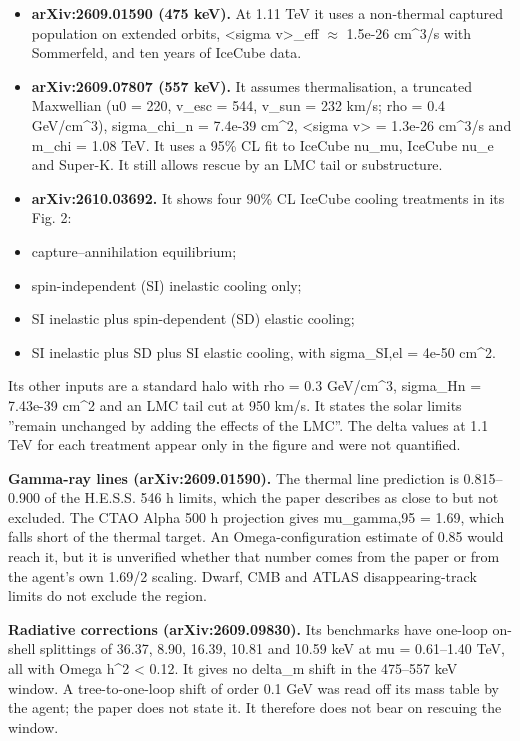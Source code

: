 \documentclass[11pt,a4paper]{article}
\begin{document}
\begin{itemize}
  \item \textbf{arXiv:2609.01590 (475 keV).} At 1.11 TeV it uses a non-thermal captured population on extended orbits, \textless{}sigma v\textgreater{}\_eff $\approx$ 1.5e-26 cm\textasciicircum{}3/s with Sommerfeld, and ten years of IceCube data.
  \item \textbf{arXiv:2609.07807 (557 keV).} It assumes thermalisation, a truncated Maxwellian (u0 = 220, v\_esc = 544, v\_sun = 232 km/s; rho = 0.4 GeV/cm\textasciicircum{}3), sigma\_chi\_n = 7.4e-39 cm\textasciicircum{}2, \textless{}sigma v\textgreater{} = 1.3e-26 cm\textasciicircum{}3/s and m\_chi = 1.08 TeV. It uses a 95\% CL fit to IceCube nu\_mu, IceCube nu\_e and Super-K. It still allows rescue by an LMC tail or substructure.
  \item \textbf{arXiv:2610.03692.} It shows four 90\% CL IceCube cooling treatments in its Fig. 2:
  \item capture--annihilation equilibrium;
  \item spin-independent (SI) inelastic cooling only;
  \item SI inelastic plus spin-dependent (SD) elastic cooling;
  \item SI inelastic plus SD plus SI elastic cooling, with sigma\_SI,el = 4e-50 cm\textasciicircum{}2.
\end{itemize}
  Its other inputs are a standard halo with rho = 0.3 GeV/cm\textasciicircum{}3, sigma\_Hn = 7.43e-39 cm\textasciicircum{}2 and an LMC tail cut at 950 km/s. It states the solar limits ''remain unchanged by adding the effects of the LMC''. The delta values at 1.1 TeV for each treatment appear only in the figure and were not quantified.

\textbf{Gamma-ray lines (arXiv:2609.01590).} The thermal line prediction is 0.815--0.900 of the H.E.S.S. 546 h limits, which the paper describes as close to but not excluded. The CTAO Alpha 500 h projection gives mu\_gamma,95 = 1.69, which falls short of the thermal target. An Omega-configuration estimate of 0.85 would reach it, but it is unverified whether that number comes from the paper or from the agent's own 1.69/2 scaling. Dwarf, CMB and ATLAS disappearing-track limits do not exclude the region.

\textbf{Radiative corrections (arXiv:2609.09830).} Its benchmarks have one-loop on-shell splittings of 36.37, 8.90, 16.39, 10.81 and 10.59 keV at \textbar{}mu\textbar{} = 0.61--1.40 TeV, all with Omega h\textasciicircum{}2 \textless{} 0.12. It gives no delta\_m shift in the 475--557 keV window. A tree-to-one-loop shift of order 0.1 GeV was read off its mass table by the agent; the paper does not state it. It therefore does not bear on rescuing the window.
\end{document}
